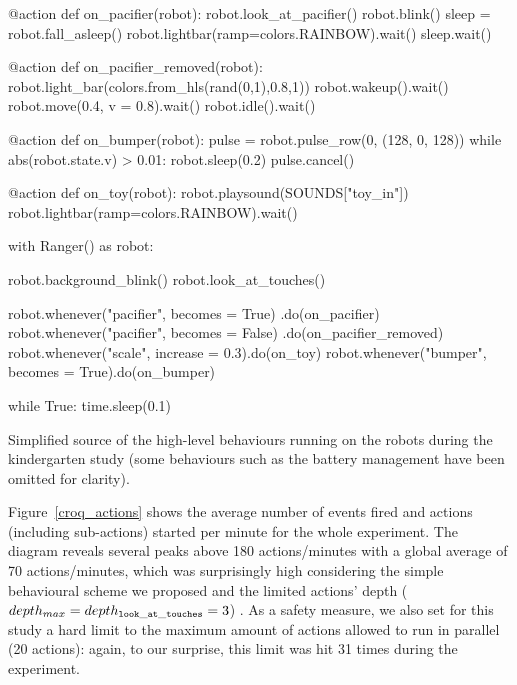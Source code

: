 \documentclass[a4paper, 10pt, conference]{ieeeconf}      %
\begin{document}
\begin{listing}[h!]

\begin{pythoncode}
    @action
    def on_pacifier(robot):
        robot.look_at_pacifier()
        robot.blink()
        sleep = robot.fall_asleep()
        robot.lightbar(ramp=colors.RAINBOW).wait()
        sleep.wait()
    
    @action
    def on_pacifier_removed(robot):
        robot.light_bar(colors.from_hls(rand(0,1),0.8,1))
        robot.wakeup().wait()
        robot.move(0.4, v = 0.8).wait()
        robot.idle().wait()
    
    @action
    def on_bumper(robot):
        pulse = robot.pulse_row(0, (128, 0, 128))
        while abs(robot.state.v) > 0.01:
            robot.sleep(0.2)
        pulse.cancel()
    
    @action
    def on_toy(robot):
        robot.playsound(SOUNDS["toy_in"])
        robot.lightbar(ramp=colors.RAINBOW).wait()
    
    with Ranger() as robot:
    
        robot.background_blink()
        robot.look_at_touches()
    
        robot.whenever("pacifier", becomes = True)
                                    .do(on_pacifier)
        robot.whenever("pacifier", becomes = False)
                                    .do(on_pacifier_removed)
        robot.whenever("scale", increase = 0.3).do(on_toy)
        robot.whenever("bumper", becomes = True).do(on_bumper)
    
        while True:
            time.sleep(0.1)
\end{pythoncode}
\caption{Simplified source of the high-level behaviours running on the robots during the
kindergarten study (some behaviours such as the battery management have been omitted for
clarity).}
\label{croquignole_no_move}
\end{listing}

Figure~\ref{croq_actions} shows the average number of events fired and actions
(including sub-actions) started per minute for the whole experiment. The
diagram reveals several peaks above 180 actions/minutes with a global average of
70 actions/minutes, which was surprisingly high considering the simple
behavioural scheme we proposed and the limited actions' depth
($depth_{max}=depth_{\tt look\_at\_touches}=3$) . As a safety measure, we also
set for this study a hard limit to the maximum amount of actions allowed to run
in parallel (20 actions): again, to our surprise, this limit was hit 31 times
during the experiment.
\end{document}
